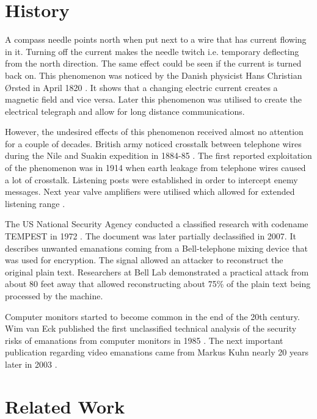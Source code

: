 \documentclass[a4paper,12pt,twoside,openright]{report}
\begin{document}
\section{History}

A compass needle points north when put next to a wire that has current flowing in it. Turning off the current makes the needle twitch i.e. temporary deflecting from the north direction. The same effect could be seen if the current is turned back on. This phenomenon was noticed by the Danish physicist Hans Christian \O rsted in April 1820 \cite{jelved1998selected}. It shows that a changing electric current creates a magnetic field and vice versa. Later this phenomenon was utilised to create the electrical telegraph and allow for long distance communications.

However, the undesired effects of this phenomenon received almost no attention for a couple of decades. British army noticed crosstalk between telephone wires during the Nile and Suakin expedition in 1884-85 \cite{nalder1958history}. The first reported exploitation of the phenomenon was in 1914 when earth leakage from telephone wires caused a lot of crosstalk. Listening posts were established in order to intercept enemy messages. Next year valve amplifiers were utilised which allowed for extended listening range \cite{anderson2008security}.

The US National Security Agency conducted a classified research with codename TEMPEST in 1972 \cite{friedman2007tempest}. The document was later partially declassified in 2007. It describes unwanted emanations coming from a Bell-telephone mixing device that was used for encryption. The signal allowed an attacker to reconstruct the original plain text. Researchers at Bell Lab demonstrated a practical attack from about 80 feet away that allowed reconstructing about 75\% of the plain text being processed by the machine.

Computer monitors started to become common in the end of the 20th century. Wim van Eck published the first unclassified technical analysis of the security risks of emanations from computer monitors in 1985 \cite{van1985electromagnetic}. The next important publication regarding video emanations came from Markus Kuhn nearly 20 years later in 2003 \cite{kuhn2003compromising}. 

\section{Related Work}
\label{sec:RelatedWork}
\end{document}
